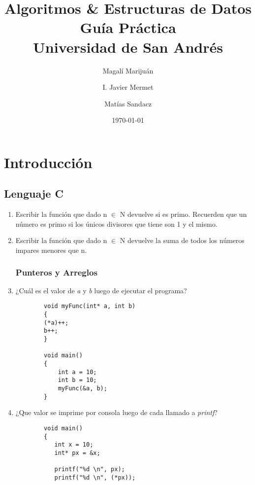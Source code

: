 \documentclass[titlepage,oneside]{book}
\title{
	Algoritmos \& Estructuras de Datos\\
	\large Guía Práctica \\
	\large Universidad de San Andrés
}
\author{Magalí Marijuán\\
	\and
	I. Javier Mermet
	\and
	Matías Sandacz
}
\date{\today}
\begin{document}
\maketitle
\tableofcontents

\part{Introducción}
\chapter{Lenguaje C}

\begin{enumerate}

    \section{Ejercicios para entrar en calor}

    \item Escribir la función que dado n $\in$ N devuelve si es primo. Recuerden que un número es primo si los únicos divisores que tiene son 1 y el mismo.
    
    \item Escribir la función que dado n $\in$ N devuelve la suma de todos los números impares menores que n.

    \section{Punteros y Arreglos}

    \item ¿Cuál es el valor de \textit{a} y \textit{b} luego de ejecutar el programa?
    \begin{verbatim}
        void myFunc(int* a, int b)
        {
        (*a)++;
        b++;
        }

        void main()
        {
            int a = 10;
            int b = 10;
            myFunc(&a, b);
        }
    \end{verbatim}

    \item ¿Que valor se imprime por consola luego de cada llamado a \textit{printf}?
    \begin{verbatim}
        void main()
        {
           int x = 10;
           int* px = &x;
    
           printf("%d \n", px);
           printf("%d \n", (*px));
    

\end{verbatim}
\end{enumerate}
\end{document}
